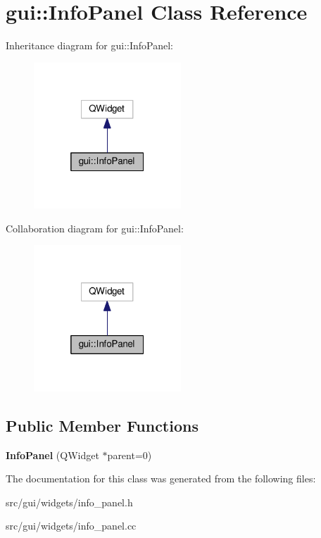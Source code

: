\hypertarget{classgui_1_1InfoPanel}{}\section{gui\+:\+:Info\+Panel Class Reference}
\label{classgui_1_1InfoPanel}


Inheritance diagram for gui\+:\+:Info\+Panel\+:\nopagebreak
\begin{figure}[H]
\begin{center}
\leavevmode
\includegraphics[width=157pt]{classgui_1_1InfoPanel__inherit__graph}
\end{center}
\end{figure}


Collaboration diagram for gui\+:\+:Info\+Panel\+:\nopagebreak
\begin{figure}[H]
\begin{center}
\leavevmode
\includegraphics[width=157pt]{classgui_1_1InfoPanel__coll__graph}
\end{center}
\end{figure}
\subsection*{Public Member Functions}
\begin{DoxyCompactItemize}
\item 
{\bfseries Info\+Panel} (Q\+Widget $\ast$parent=0)\hypertarget{classgui_1_1InfoPanel_a6df4d21052d6b3054d4e97841e0e1f3b}{}\label{classgui_1_1InfoPanel_a6df4d21052d6b3054d4e97841e0e1f3b}

\end{DoxyCompactItemize}


The documentation for this class was generated from the following files\+:\begin{DoxyCompactItemize}
\item 
src/gui/widgets/info\+\_\+panel.\+h\item 
src/gui/widgets/info\+\_\+panel.\+cc\end{DoxyCompactItemize}
